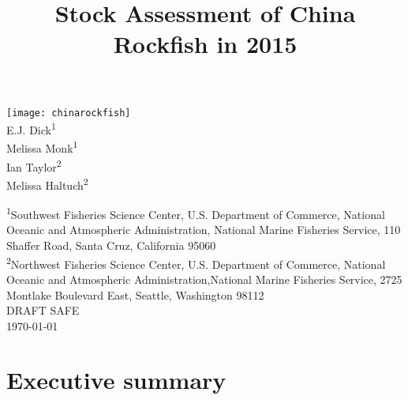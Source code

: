 \documentclass[12pt,]{article}
\title{Stock Assessment of China Rockfish in 2015}
\author{}
\date{}
\begin{document}
\maketitle



\begin{center}
\thispagestyle{empty}

\vspace{2cm}

\texttt{[image: chinarockfish]}~\\[1cm]



E.J. Dick\textsuperscript{1}\\
Melissa Monk\textsuperscript{1}\\
Ian Taylor\textsuperscript{2}\\
Melissa Haltuch\textsuperscript{2}\\

\vspace{1cm}


\textsuperscript{1}Southwest Fisheries Science Center, U.S. Department of Commerce, National Oceanic and Atmospheric Administration, National Marine Fisheries Service, 110 Shaffer Road, Santa Cruz, California 95060\\

\textsuperscript{2}Northwest Fisheries Science Center, U.S. Department of Commerce, National Oceanic and Atmospheric Administration,National Marine Fisheries Service, 2725 Montlake Boulevard East, Seattle, Washington 98112\\

\vfill
\textsc{\Large DRAFT SAFE}\\[0.5cm]
{\large \today}

\maketitle

\setcounter{page}{1}
\end{center}

{
\hypersetup{linkcolor=black}
\setcounter{tocdepth}{4}
\tableofcontents
}
\pagebreak
{} \setcounter{page}{1}

\section*{Executive summary}\label{executive-summary}
\end{document}
